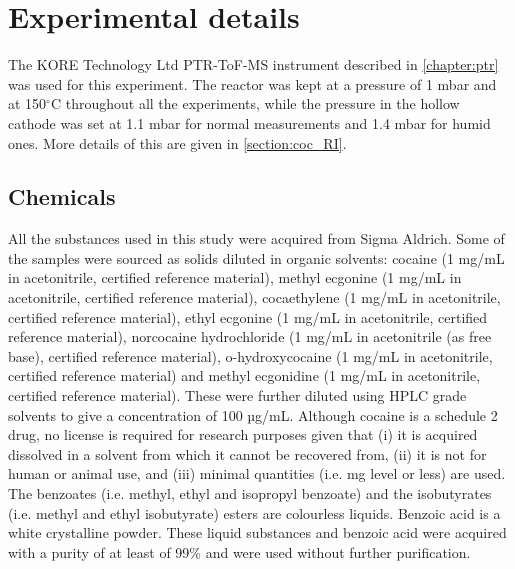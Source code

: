 






 
\section{Experimental details}\label{section:coc_expdet}
The KORE Technology Ltd PTR-ToF-MS instrument described in \autoref{chapter:ptr} was used for this experiment. 
The reactor was kept at a pressure of 1 mbar and at 150$^\circ$C throughout all the experiments, while the pressure in the hollow cathode was set at 1.1 mbar for normal measurements and 1.4 mbar for humid ones. More details of this are given in \autoref{section:coc_RI}.


\subsection{Chemicals}
All the substances used in this study were acquired from Sigma Aldrich. Some of the samples were sourced as solids diluted in organic solvents: cocaine (1 mg/mL in acetonitrile, certified reference material), methyl ecgonine (1 mg/mL in acetonitrile, certified reference material), cocaethylene (1 mg/mL in acetonitrile, certified reference material), ethyl ecgonine (1 mg/mL in acetonitrile, certified reference material), norcocaine hydrochloride (1 mg/mL in acetonitrile (as free base), certified reference material), o-hydroxycocaine (1 mg/mL in acetonitrile, certified reference material) and methyl ecgonidine (1 mg/mL in acetonitrile, certified reference material). These were further diluted using HPLC grade solvents to give a concentration of 100 µg/mL. Although cocaine is a schedule 2 drug, no license is required for research purposes given that (i) it is acquired dissolved in a solvent from which it cannot be recovered from, (ii) it is not for human or animal use, and (iii) minimal quantities (i.e. mg level or less) are used.
The benzoates (i.e. methyl, ethyl and isopropyl benzoate) and the isobutyrates (i.e. methyl and ethyl isobutyrate) esters are colourless liquids. Benzoic acid is a white crystalline powder. These liquid substances and benzoic acid were acquired with a purity of at least of 99\% and were used without further purification.




